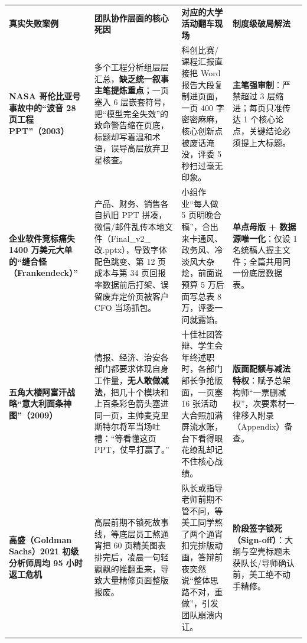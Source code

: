 \documentclass[UTF8,a4paper,11pt,fontset=none]{ctexart}
\newcommand{\fname}[1]{{\xeCJKsetup{CJKecglue={}}\ttfamily #1}}
\begin{document}
{\sffamily\footnotesize\linespread{1.28}\selectfont
\setlength{\tabcolsep}{6pt}
\begin{tabularx}{\textwidth}{@{\hspace{7pt}}Y{0.86}Y{1.12}Y{1.06}Y{0.96}@{\hspace{7pt}}}
{\color{white}\bfseries 真实失败案例} & {\color{white}\bfseries 团队协作层面的核心死因} & {\color{white}\bfseries 对应的大学活动翻车现场} & {\color{white}\bfseries 制度级破局解法} \\
\textbf{NASA 哥伦比亚号事故中的“波音 28 页工程 PPT”（2003）} &
多个工程分析组层层汇总，\textbf{缺乏统一叙事主笔提炼重点}；一页塞入 6 层嵌套符号，把“模型完全失效”的致命警告缩在页底，标题却写着温和术语，误导高层放弃卫星核查。 &
科创比赛/课程汇报直接把 Word 报告大段复制进页面，一页 400 字密密麻麻，核心创新点被废话淹没，评委 5 秒扫过毫无印象。 &
\textbf{主笔强审制}：严禁超过 3 层缩进；每页只准传达 1 个核心论点，关键结论必须提上大标题。 \\
\textbf{企业软件竞标痛失 1400 万美元大单的“缝合怪（Frankendeck）”} &
产品、财务、销售各自扒旧 PPT 拼凑，微信/邮件乱传本地文件（\fname{Final\_v2\_改.pptx}），导致字体配色跳变、第 12 页成本与第 34 页回报率数据前后打架、误留废弃定价页被客户 CFO 当场抓包。 &
小组作业“每人做 5 页明晚合稿”，合出来卡通风、政务风、冷淡风大杂烩，前面说预算 5 万后面写总表 8 万，评委一问就露馅。 &
\textbf{单点母版 + 数据源唯一化}：仅设 1 名统稿人握主文件；全篇共用同一份底层数据表。 \\
\textbf{五角大楼阿富汗战略“意大利面条神图”（2009）} &
情报、经济、治安各部门都要求体现自身工作量，\textbf{无人敢做减法}，把几十个模块和上百条彩色箭头塞进同一页，主帅麦克里斯特尔将军当场吐槽：“等看懂这页 PPT，仗早打赢了。” &
十佳社团答辩、学生会年终述职时，各部门部长争抢版面，一页塞 16 张活动大合照加满屏流水账，台下看得眼花缭乱却记不住核心战绩。 &
\textbf{版面配额与减法特权}：赋予总架构师“一票删减权”，次要素材一律移入附录（Appendix）备查。 \\
\textbf{高盛（Goldman Sachs）2021 初级分析师周均 95 小时返工危机} &
高层前期不锁死故事线，等底层员工熬通宵把 60 页精美图表排完后，凌晨一句轻飘飘的推翻重来，导致大量精修页面整版报废。 &
队长或指导老师前期不管不问，等美工同学熬了两个通宵扣完排版动画，答辩前夜突然说“整体思路不对，重做”，引发团队崩溃内讧。 &
\textbf{阶段签字锁死（Sign-off）}：大纲与空壳标题未获队长/导师确认前，美工绝不动手精修。 \\
\end{tabularx}}
\end{document}
